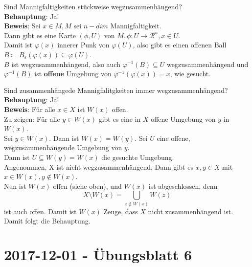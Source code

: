\begin{problem*}[4a]
Sind Mannigfaltigkeiten stückweise wegzusammenhängend?\\
\textbf{Behauptung}: Ja! \\
\textbf{Beweis}: Sei $ x \in M, M $ sei $ n-dim $ Mannigfaltigkeit. \\
Dann gibt es eine Karte $(\phi, U) $ von $ M, \phi: U \to  \mathcal{R}^n, x \in U$.\\
Damit ist $ \varphi(x) $ innerer Punk von $ \varphi(U)$, also gibt es einen offenen Ball \\ $B \coloneqq B_\varepsilon(\varphi(x)) \subseteq \varphi(U)$.\\
$ B $ ist wegzusammenhängend, also auch $\varphi^{-1}(B) \subseteq U$ wegzusammenhängend und $\varphi^{-1}(B)$ ist \textbf{offene} Umgebung von $\varphi^{-1}(\varphi(x)) = x$, wie gesucht.
\end{problem*}

\begin{problem*}[4b]
Sind zusammenhängede Mannigfalitgkeiten immer wegzusammenhängend?\\
\textbf{Behauptung}: Ja!\\
\textbf{Beweis}: Für alle $ x \in X$ ist $ W(x) $ offen.\\
Zu zeigen: Für alle $ y \in W(x)$ gibt es eine in $ X $ offene Umgebung von $ y $ in $ W(x) $.\\
Sei $ y \in W(x)$. Dann ist $ W(x) = W(y)$. Sei $ U $ eine offene, wegzusammenhängende Umgebung von $ y $.\\
Dann ist $ U \subseteq W(y) = W(x)$ die gesuchte Umgebung.\\
Angenommen, X ist nicht wegzusammenhängend. Dann gibt es $ x,y \in X $ mit $x \in W(x), y \notin W(x)$. \\
Nun ist $W(x)$ offen (siehe oben), und $ W(x) $ ist abgeschlossen, denn
\begin{equation*}
	X \setminus W(x) = \bigcup_{ z \notin W(x)} W(z)
\end{equation*}
ist auch offen. Damit ist $ W(x) $ Zeuge, dass $ X $ nicht zusammenhängend ist. Damit folgt die Behauptung.\\
\end{problem*}


\newpage
\section{2017-12-01 - Übungsblatt 6} %
\label{2017-12-01}

